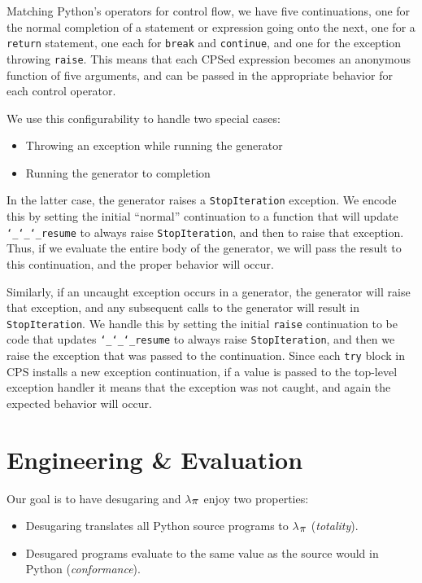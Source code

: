 \documentclass[10pt]{sigplanconf}
\newcommand{\sectionNewpage}{}
\newcommand{\Scribtexttt}[1]{{\texttt{#1}}}
\newcommand{\textsub}[1]{$_{\hbox{\textsmaller{#1}}}$}
\newcommand{\Larger}[1]{\textlarger{#1}}
\newlength{\stabLeft}
\newcommand{\atItemizeStart}[0]{\addtolength{\stabLeft}{\labelsep}
                                \addtolength{\stabLeft}{\labelwidth}}
\let\SOriginalthesubsection\thesubsection
\newcommand{\Ssection}[2]{\section[#1]{#2}\let\thesubsection\SOriginalthesubsection}
\begin{document}
Matching Python{'}s operators for control flow, we have five continuations, one
for the normal completion of a statement or expression going onto the next, one
for a \Scribtexttt{return} statement, one each for \Scribtexttt{break} and \Scribtexttt{continue},
and one for the exception throwing \Scribtexttt{raise}.  This means that each CPSed
expression becomes an anonymous function of five arguments, and can be passed
in the appropriate behavior for each control operator.

We use this configurability to handle two special cases:

\begin{itemize}\atItemizeStart

\item Throwing an exception while running the generator

\item Running the generator to completion\end{itemize}

In the latter case, the generator raises a \Scribtexttt{StopIteration} exception. We
encode this by setting the initial {``}normal{''} continuation to a function that
will update \Scribtexttt{{\char`\_}{\char`\_}{\char`\_}resume} to always raise \Scribtexttt{StopIteration}, and then to
raise that exception. Thus, if we evaluate the entire body of the generator, we
will pass the result to this continuation, and the proper behavior will occur.

Similarly, if an uncaught exception occurs in a generator, the generator will
raise that exception, and any subsequent calls to the generator will result in
\Scribtexttt{StopIteration}. We handle this by setting the initial \Scribtexttt{raise}
continuation to be code that updates \Scribtexttt{{\char`\_}{\char`\_}{\char`\_}resume} to always raise
\Scribtexttt{StopIteration}, and then we raise the exception that was passed to the
continuation. Since each \Scribtexttt{try} block in CPS installs a new exception
continuation, if a value is passed to the top{-}level exception handler it means
that the exception was not caught, and again the expected behavior will occur.

\sectionNewpage

\Ssection{Engineering \& Evaluation}{Engineering \& Evaluation}\label{t:x28part_x22sx3aengineeringx22x29}

Our goal is to have desugaring and $\lambda$\textsub{\Larger{$\pi$}} enjoy two properties:


\noindent \begin{itemize}\atItemizeStart

\item Desugaring translates all Python source programs to $\lambda$\textsub{\Larger{$\pi$}} (\textit{totality}).

\item Desugared programs evaluate to
the same value as the source would in Python (\textit{conformance}).\end{itemize}
\end{document}
